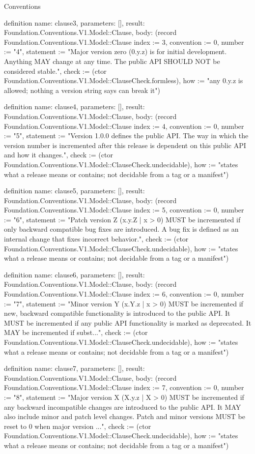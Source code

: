 \begin{lexlean}{Conventions}
\begin{semanticmodule}
definition{
  name: clause3,
  parameters: [],
  result: Foundation.Conventions.V1.Model::Clause,
  body: (record Foundation.Conventions.V1.Model::Clause {index := 3, convention := 0, number := "4", statement := "Major version zero (0.y.z) is for initial development. Anything MAY change at any time. The public API SHOULD NOT be considered stable.", check := (ctor Foundation.Conventions.V1.Model::ClauseCheck.formless), how := "any 0.y.z is allowed; nothing a version string says can break it"})
}

definition{
  name: clause4,
  parameters: [],
  result: Foundation.Conventions.V1.Model::Clause,
  body: (record Foundation.Conventions.V1.Model::Clause {index := 4, convention := 0, number := "5", statement := "Version 1.0.0 defines the public API. The way in which the version number is incremented after this release is dependent on this public API and how it changes.", check := (ctor Foundation.Conventions.V1.Model::ClauseCheck.undecidable), how := "states what a release means or contains; not decidable from a tag or a manifest"})
}

definition{
  name: clause5,
  parameters: [],
  result: Foundation.Conventions.V1.Model::Clause,
  body: (record Foundation.Conventions.V1.Model::Clause {index := 5, convention := 0, number := "6", statement := "Patch version Z (x.y.Z | x > 0) MUST be incremented if only backward compatible bug fixes are introduced. A bug fix is defined as an internal change that fixes incorrect behavior.", check := (ctor Foundation.Conventions.V1.Model::ClauseCheck.undecidable), how := "states what a release means or contains; not decidable from a tag or a manifest"})
}

definition{
  name: clause6,
  parameters: [],
  result: Foundation.Conventions.V1.Model::Clause,
  body: (record Foundation.Conventions.V1.Model::Clause {index := 6, convention := 0, number := "7", statement := "Minor version Y (x.Y.z | x > 0) MUST be incremented if new, backward compatible functionality is introduced to the public API. It MUST be incremented if any public API functionality is marked as deprecated. It MAY be incremented if subst...", check := (ctor Foundation.Conventions.V1.Model::ClauseCheck.undecidable), how := "states what a release means or contains; not decidable from a tag or a manifest"})
}

definition{
  name: clause7,
  parameters: [],
  result: Foundation.Conventions.V1.Model::Clause,
  body: (record Foundation.Conventions.V1.Model::Clause {index := 7, convention := 0, number := "8", statement := "Major version X (X.y.z | X > 0) MUST be incremented if any backward incompatible changes are introduced to the public API. It MAY also include minor and patch level changes. Patch and minor versions MUST be reset to 0 when major version ...", check := (ctor Foundation.Conventions.V1.Model::ClauseCheck.undecidable), how := "states what a release means or contains; not decidable from a tag or a manifest"})
}


\end{semanticmodule}
\end{lexlean}
